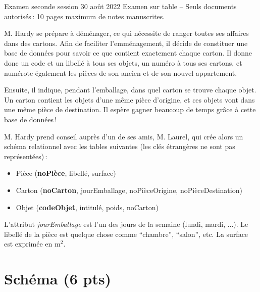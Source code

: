%
{Examen seconde session 30 août 2022}%
{Examen sur table -- Seuls documents autorisés\,: 10 pages maximum de notes manuscrites.}%

M. Hardy se prépare à déménager, ce qui nécessite
de ranger toutes ses affaires dans des cartons.
Afin de faciliter l'emménagement, il décide de constituer
une base de données pour savoir ce que contient
exactement chaque carton. Il donne donc un code 
et un libellé à tous ses objets, un numéro à
tous ses cartons, et numérote également
les pièces de son ancien et de son nouvel appartement.

Ensuite, il indique, pendant l'emballage, dans quel
carton se trouve chaque objet. Un carton
contient les objets d'une même pièce d'origine, et
ces objets vont dans une même pièce de destination.
Il espère gagner beaucoup de temps grâce à cette base de données\,!

M. Hardy prend conseil auprès d'un de ses amis, M. Laurel, qui
crée alors un schéma relationnel avec les tables suivantes
(les clés étrangères ne sont pas représentées)\,:

      \begin{itemize}
        \item Pièce (\textbf{noPièce}, libellé, surface)
        \item Carton (\textbf{noCarton}, jourEmballage, noPièceOrigine, 
                            noPièceDestination)
        \item  Objet (\textbf{codeObjet}, intitulé, poids,
                     noCarton)
       \end{itemize}

L'attribut \textit{jourEmballage} est l'un
des jours de la semaine (lundi, mardi, ...). Le libellé
de la pièce est quelque chose comme ``chambre'', ``salon'',
etc. La surface est exprimée en m$^2$.

\section{Schéma (6 pts)}

